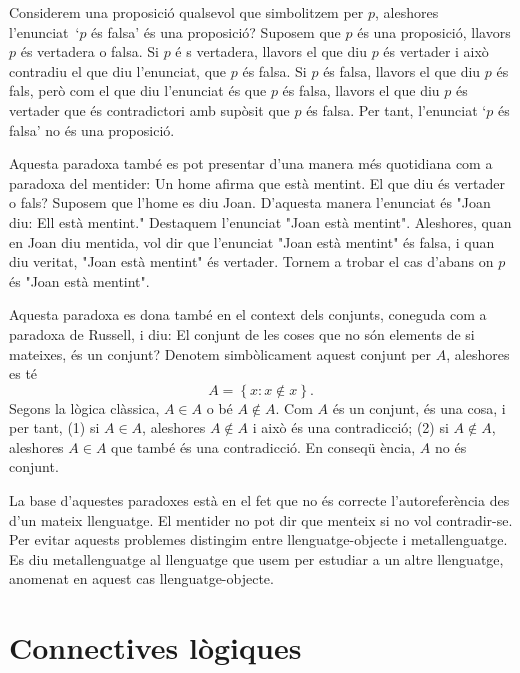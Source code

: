 \begin{obs}
Considerem una proposici\'{o} qualsevol que simbolitzem per $p$, aleshores
l'enunciat\ `$p$ \'{e}s falsa' \'{e}s una proposici\'{o}? Suposem que $p$
\'{e}s una proposici\'{o}, llavors $p$ \'{e}s vertadera o falsa. Si $p$ \'{e}%
s vertadera, llavors el que diu $p$ \'{e}s vertader i aix\`{o} contradiu el
que diu l'enunciat, que $p$ \'{e}s falsa. Si $p$ \'{e}s falsa, llavors el
que diu $p$ \'{e}s fals, per\`{o} com el que diu l'enunciat \'{e}s que $p$
\'{e}s falsa, llavors el que diu $p$ \'{e}s vertader que \'{e}s
contradictori amb sup\`{o}sit que $p$ \'{e}s falsa. Per tant, l'enunciat `$p$
\'{e}s falsa' no \'{e}s una proposici\'{o}.

Aquesta paradoxa tamb\'{e} es pot presentar d'una manera m\'{e}s quotidiana
com a paradoxa del mentider: Un home afirma que est\`{a} mentint. El que diu
\'{e}s vertader o fals? Suposem que l'home es diu Joan. D'aquesta manera
l'enunciat \'{e}s "Joan diu: Ell est\`{a} mentint." Destaquem l'enunciat
"Joan est\`{a} mentint". Aleshores, quan en Joan diu mentida, vol dir que
l'enunciat "Joan est\`{a} mentint" \'{e}s falsa, i quan diu veritat, "Joan
est\`{a} mentint" \'{e}s vertader. Tornem a trobar el cas d'abans on $p$
\'{e}s "Joan est\`{a} mentint".

Aquesta paradoxa es dona tamb\'{e} en el context dels conjunts, coneguda com
a paradoxa de Russell, i diu: El conjunt de les coses que no s\'{o}n
elements de si mateixes, \'{e}s un conjunt? Denotem simb\`{o}licament aquest
conjunt per $A$, aleshores es t\'{e}%
\begin{equation*}
A=\left\{ x:x\notin x\right\} .
\end{equation*}
Segons la l\`{o}gica cl\`{a}ssica, $A\in A$ o b\'{e} $A\notin A$. Com $A$
\'{e}s un conjunt, \'{e}s una cosa, i per tant, (1) si $A\in A$, aleshores $%
A\notin A$ i aix\`{o} \'{e}s una contradicci\'{o}; (2) si $A\notin A$,
aleshores $A\in A$ que tamb\'{e} \'{e}s una contradicci\'{o}. En conseq\"{u}%
\`{e}ncia, $A$ no \'{e}s conjunt.

La base d'aquestes paradoxes est\`{a} en el fet que no \'{e}s correcte
l'autorefer\`{e}ncia des d'un mateix llenguatge. El mentider no pot dir que
menteix si no vol contradir-se. Per evitar aquests problemes distingim entre
llenguatge-objecte i metallenguatge. Es diu metallenguatge al llenguatge que
usem per estudiar a un altre llenguatge, anomenat en aquest cas
llenguatge-objecte.
\end{obs}

\section{Connectives l\`{o}giques}

